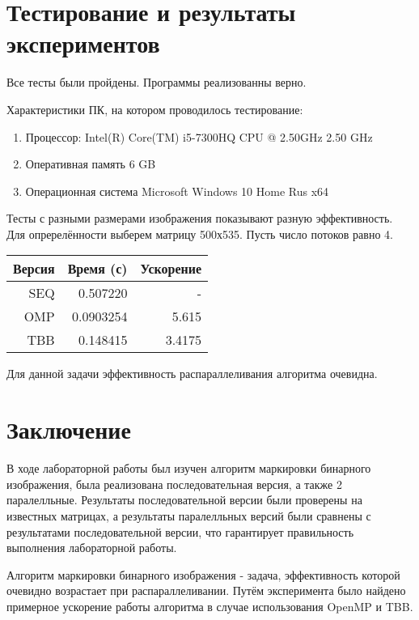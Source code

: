 \documentclass{report}
\begin{document}
\section*{Тестирование и результаты экспериментов}
Все тесты были пройдены. Программы реализованны верно.
\par Характеристики ПК, на котором проводилось тестирование:
\begin{enumerate}
    \item Процессор: Intel(R) Core(TM) i5-7300HQ CPU @ 2.50GHz   2.50 GHz
    \item Оперативная память 6 GB
    \item Операционная система Microsoft Windows 10 Home Rus x64
\end{enumerate}
\par Тесты с разными размерами изображения показывают разную эффективность. Для опререлённости выберем матрицу 500х535.
Пусть число потоков равно 4.
\begin{table}[!h]
\centering
\begin{tabular}{| r | r | r |}
\hline
Версия & Время (с) & Ускорение \\[5pt]
\hline
SEQ & 0.507220 & -     \\
OMP & 0.0903254 & 5.615 \\
TBB & 0.148415 & 3.4175 \\
\hline
\end{tabular}
\end{table}
\par Для данной задачи эффективность распараллеливания алгоритма очевидна.

\newpage
\section*{Заключение}
В ходе лабораторной работы был изучен алгоритм маркировки бинарного изображения, была реализована последовательная версия, а также 2 паралелльные. Результаты последовательной версии были проверены на известных матрицах, а результаты паралелльных версий были сравнены с результатами последовательной версии, что гарантирует правильность выполнения лабораторной работы.
\par Алгоритм маркировки бинарного изображения - задача, эффективность которой очевидно возрастает при распараллеливании. Путём эксперимента было найдено примерное ускорение работы алгоритма в случае использования OpenMP и TBB.
\end{document}
